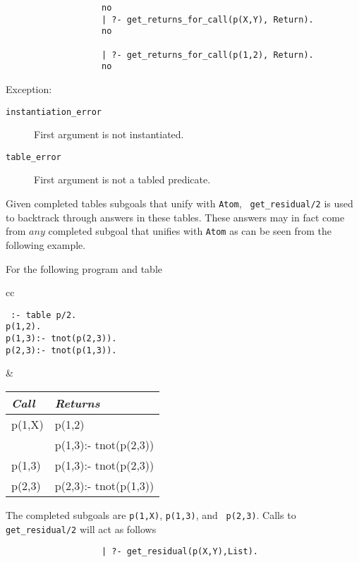 \begin{description}
{\begin{verbatim}
                   no
                   | ?- get_returns_for_call(p(X,Y), Return).
                   no

                   | ?- get_returns_for_call(p(1,2), Return).
                   no
      \end{verbatim}
      }

Exception:
    \begin{description}
    \item[{\tt instantiation\_error}]
	First argument is not instantiated.
    \item[{\tt table\_error}]
	First argument is not a tabled predicate.
    \end{description}


%
Given completed tables subgoals that unify with {\tt Atom}, {\tt
get\_residual/2} is used to backtrack through answers in these tables.
These answers may in fact come from $any$ completed subgoal that
unifies with {\tt Atom} as can be seen from the following example.

For the following program and table
     \begin{center}
     \begin{tabular}{cc}
     \begin{minipage}{2.1in}
     {\tt
          :- table p/2.	\\
	  p(1,2). \\
	  p(1,3):- tnot(p(2,3)). \\
	  p(2,3):- tnot(p(1,3)). 
     }
     \end{minipage}
     &
     \begin{tabular}{||l|l||}   \hline
     {\em Call}			& {\em Returns} \\ \hline \hline
     p(1,X)			& p(1,2) \\ 
 	       			& p(1,3):- tnot(p(2,3)) \\ \hline
     p(1,3)			& p(1,3):- tnot(p(2,3)) \\ \hline
     p(2,3)			& p(2,3):- tnot(p(1,3)) \\ \hline
     \end{tabular}
     \end{tabular}
     \end{center}
The completed subgoals are {\tt p(1,X)}, {\tt p(1,3)}, and {\tt
p(2,3)}.  Calls to {\tt get\_residual/2} will act as follows
%
{\footnotesize 
\begin{verbatim} 
                   | ?- get_residual(p(X,Y),List).


\end{verbatim}}
\end{description}
